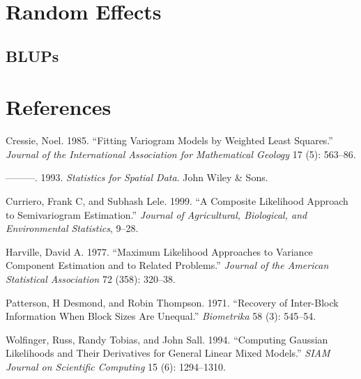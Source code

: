 \documentclass{article}
\begin{document}
\hypertarget{random-effects}{%
\section{Random Effects}\label{random-effects}}

\hypertarget{blups}{%
\subsection{BLUPs}\label{blups}}

\hypertarget{references}{%
\section*{References}\label{references}}

\hypertarget{refs}{}
\leavevmode\hypertarget{ref-cressie1985fitting}{}%
Cressie, Noel. 1985. ``Fitting Variogram Models by Weighted Least
Squares.'' \emph{Journal of the International Association for
Mathematical Geology} 17 (5): 563--86.

\leavevmode\hypertarget{ref-cressie1993statistics}{}%
---------. 1993. \emph{Statistics for Spatial Data}. John Wiley \& Sons.

\leavevmode\hypertarget{ref-curriero1999composite}{}%
Curriero, Frank C, and Subhash Lele. 1999. ``A Composite Likelihood
Approach to Semivariogram Estimation.'' \emph{Journal of Agricultural,
Biological, and Environmental Statistics}, 9--28.

\leavevmode\hypertarget{ref-harville1977maximum}{}%
Harville, David A. 1977. ``Maximum Likelihood Approaches to Variance
Component Estimation and to Related Problems.'' \emph{Journal of the
American Statistical Association} 72 (358): 320--38.

\leavevmode\hypertarget{ref-patterson1971recovery}{}%
Patterson, H Desmond, and Robin Thompson. 1971. ``Recovery of
Inter-Block Information When Block Sizes Are Unequal.''
\emph{Biometrika} 58 (3): 545--54.

\leavevmode\hypertarget{ref-wolfinger1994computing}{}%
Wolfinger, Russ, Randy Tobias, and John Sall. 1994. ``Computing Gaussian
Likelihoods and Their Derivatives for General Linear Mixed Models.''
\emph{SIAM Journal on Scientific Computing} 15 (6): 1294--1310.



\end{document}
